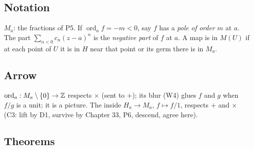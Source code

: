 \subsection*{Notation}

\begin{lines}
\item[\lab{N1}] $M_a$: the fractions of P5. If $\operatorname{ord}_a f = -m < 0$, say $f$ has a \emph{pole of order $m$} at $a$. The part $\sum_{n < 0} c_n (z - a)^n$ is the \emph{negative part} of $f$ at $a$. A map is in $M(U)$ if at each point of $U$ it is in $H$ near that point or its germ there is in $M_a$.
\end{lines}

\subsection*{Arrow}

\begin{lines}
\item[\lab{P7}] $\operatorname{ord}_a : M_a \setminus \{0\} \to \mathbb{Z}$ respects $\times$ (sent to $+$); its blur (W4) glues $f$ and $g$ when $f/g$ is a unit; it is a picture. The inside $H_a \to M_a$, $f \mapsto f/1$, respects $+$ and $\times$ (C3: lift by D1, survive by Chapter 33, P6, descend, agree here).
\end{lines}

\subsection*{Theorems}

